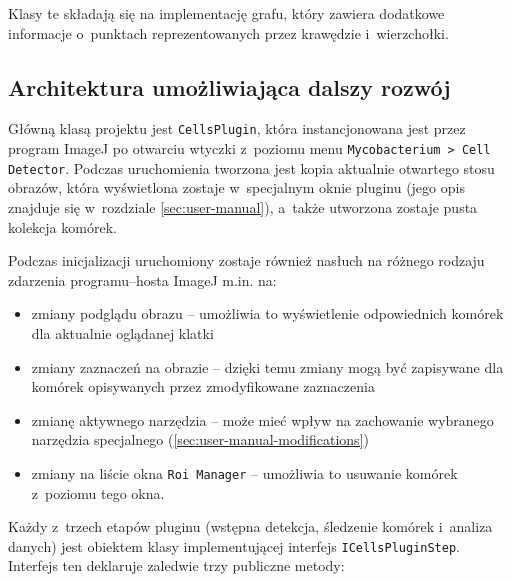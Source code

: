 \documentclass[declaration,shortabstract,mgr]{iithesis}
\begin{document}
Klasy te składają się na implementację grafu, który zawiera dodatkowe informacje o~punktach reprezentowanych przez krawędzie i~wierzchołki.

\subsection{Architektura umożliwiająca dalszy rozwój}
\label{sec:architecture}

Główną klasą projektu jest \texttt{CellsPlugin}, która instancjonowana jest przez program ImageJ po otwarciu wtyczki z~poziomu menu \texttt{Mycobacterium > Cell Detector}.
Podczas uruchomienia tworzona jest kopia aktualnie otwartego stosu obrazów, która wyświetlona zostaje w~specjalnym oknie pluginu (jego opis znajduje się w~rozdziale \ref{sec:user-manual}), a~także utworzona zostaje pusta kolekcja komórek.

Podczas inicjalizacji uruchomiony zostaje również nasłuch na różnego rodzaju zdarzenia programu--hosta ImageJ m.in. na:
\begin{itemize}
  \item zmiany podglądu obrazu -- umożliwia to wyświetlenie odpowiednich komórek dla aktualnie oglądanej klatki
  \item zmiany zaznaczeń na obrazie -- dzięki temu zmiany mogą być zapisywane dla komórek opisywanych przez zmodyfikowane zaznaczenia
  \item zmianę aktywnego narzędzia -- może mieć wpływ na zachowanie wybranego narzędzia specjalnego (\ref{sec:user-manual-modifications})
  \item zmiany na liście okna \texttt{Roi Manager} -- umożliwia to usuwanie komórek z~poziomu tego okna.
\end{itemize}

Każdy z~trzech etapów pluginu (wstępna detekcja, śledzenie komórek i~analiza danych) jest obiektem klasy implementującej interfejs \texttt{ICellsPluginStep}.
Interfejs ten deklaruje zaledwie trzy publiczne metody:
\end{document}
